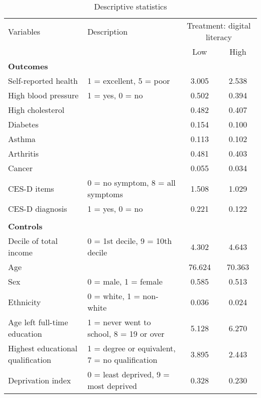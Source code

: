 \documentclass[12pt]{article}
\begin{document}
    \begin{sidewaystable}[h!]
        \centering
        \caption{Descriptive statistics}
        \label{tab:desc_stats_q1}
        \begin{tabular}{llcc}
            \toprule
            Variables & Description & \multicolumn{2}{c}{Treatment: digital literacy} \\
            & & Low & High \\
            \midrule
            \textbf{Outcomes} & & & \\
            Self-reported health & 1 = excellent, 5 = poor & 3.005 & 2.538 \\
            High blood pressure & 1 = yes, 0 = no & 0.502 & 0.394 \\
            High cholesterol &  & 0.482 & 0.407 \\
            Diabetes &  & 0.154 & 0.100 \\
            Asthma &  & 0.113 & 0.102 \\
            Arthritis &  & 0.481 & 0.403 \\
            Cancer &  & 0.055 & 0.034 \\
            CES-D items & 0 = no symptom, 8 = all symptoms & 1.508 & 1.029 \\
            CES-D diagnosis & 1 = yes, 0 = no & 0.221 & 0.122 \\
            & & & \\
            \textbf{Controls} & & & \\
            Decile of total income & 0 = 1st decile, 9 = 10th decile & 4.302 & 4.643 \\
            Age &  & 76.624 & 70.363 \\
            Sex & 0 = male, 1 = female & 0.585 & 0.513 \\
            Ethnicity & 0 = white, 1 = non-white & 0.036 & 0.024 \\
            Age left full-time education & 1 = never went to school, 8 = 19 or over & 5.128 & 6.270 \\
            Highest educational qualification & 1 = degree or equivalent, 7 = no qualification & 3.895 & 2.443 \\
            Deprivation index & 0 = least deprived, 9 = most deprived & 0.328 & 0.230 \\
            \bottomrule
        \end{tabular}
    \end{sidewaystable}
\end{document}
